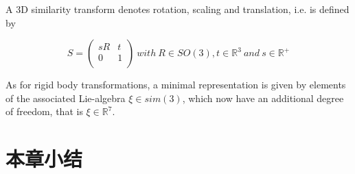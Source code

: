 A 3D similarity transform   denotes rotation, scaling and translation, i.e. is defined by

\begin{equation}
S=\left(
    \begin{array}{cc}
      sR & t \\
      0 & 1 \\
    \end{array}
  \right)
  \ with
  \ R\in SO(3),t\in {\mathbb{R}}^{3}
  \ and \ s\in {\mathbb{R}}^{+}
\end{equation}

As for rigid body transformations, a minimal representation is given by elements of the associated Lie-algebra $\xi  \in sim(3)$, which now have an additional degree of freedom, that is $\xi\in {\mathbb{R}}^{7}$.



\section{本章小结}





